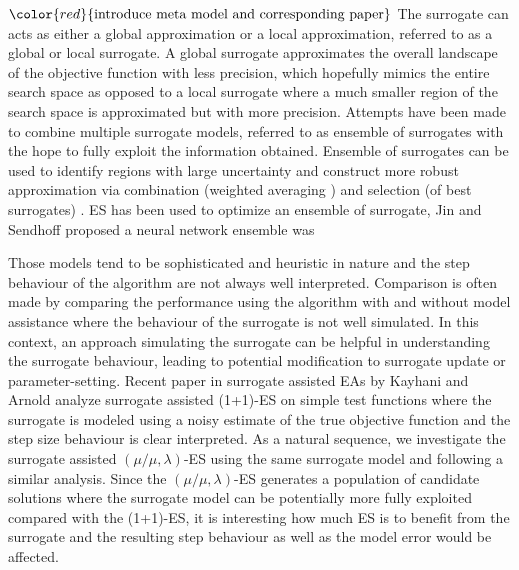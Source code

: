 $\color{red}{\text{introduce meta model and corresponding paper}}$
The surrogate can acts as either a global approximation or a local approximation, referred to as a global or local surrogate. A global surrogate approximates the overall landscape of the objective function with less precision, which hopefully mimics the entire search space as opposed to a local surrogate where a much smaller region of the search space is approximated but with more precision. Attempts have been made to combine multiple surrogate models, referred to as ensemble of surrogates with the hope to fully exploit the information obtained. Ensemble of surrogates can be used to identify regions with large uncertainty and construct more robust approximation via combination (weighted averaging ) and selection (of best surrogates) \cite{goel2007ensemble}. ES has been used to optimize an ensemble of surrogate, Jin and Sendhoff \cite{jin2004reducing} proposed a neural network ensemble was 




Those models tend to be sophisticated and heuristic in nature and the step behaviour of the algorithm are not always well interpreted. Comparison is often made by comparing the performance using the algorithm with and without model assistance where the behaviour of the surrogate is not well simulated. In this context, an approach simulating the surrogate can be helpful in understanding the surrogate behaviour, leading to potential modification to surrogate update or parameter-setting. Recent paper in surrogate assisted EAs by Kayhani and Arnold \cite{DBLP:conf/ppsn/KayhaniA18} analyze surrogate assisted (1+1)-ES on simple test functions where the surrogate is modeled using a noisy estimate of the true objective function and the step size behaviour is clear interpreted. As a natural sequence, we investigate the surrogate assisted $(\mu/\mu,\lambda)$-ES using the same surrogate model and following a similar analysis. Since the $(\mu/\mu,\lambda)$-ES generates a population of candidate solutions where the surrogate model can be potentially more fully exploited compared with the (1+1)-ES, it is interesting how much ES is to benefit from the surrogate and the resulting step behaviour as well as the model error would be affected.


